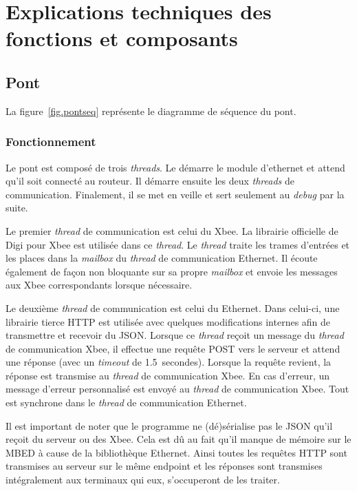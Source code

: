 \section{Explications techniques des fonctions et composants}
	\subsection{Pont}
	La figure~\ref{fig.pontseq} représente le diagramme de séquence du pont.
		\subsubsection{Fonctionnement}
		Le pont est composé de trois \emph{threads}. Le  démarre le module d’ethernet et attend qu’il soit connecté au routeur. Il démarre ensuite les deux \emph{threads} de communication. Finalement, il se met en veille et sert seulement au \emph{debug} par la suite. 

		Le premier \emph{thread} de communication est celui du Xbee. La librairie officielle de Digi pour Xbee est utilisée dans ce \emph{thread}. Le \emph{thread} traite les trames d’entrées et les places dans la \emph{mailbox} du \emph{thread} de communication Ethernet. Il écoute également de façon non bloquante sur sa propre \emph{mailbox} et envoie les messages aux Xbee correspondants lorsque nécessaire.

		Le deuxième \emph{thread} de communication est celui du Ethernet. Dans celui-ci, une librairie tierce HTTP est utilisée avec quelques modifications internes afin de transmettre et recevoir du JSON. Lorsque ce \emph{thread} reçoit un message du \emph{thread} de communication Xbee, il effectue une requête POST vers le serveur et attend une réponse (avec un \emph{timeout} de 1.5~secondes). Lorsque la requête revient, la réponse est transmise au \emph{thread} de communication Xbee. En cas d’erreur, un message d’erreur personnalisé est envoyé au \emph{thread} de communication Xbee. Tout est synchrone dans le \emph{thread} de communication Ethernet.

		Il est important de noter que le programme ne (dé)sérialise pas le JSON qu’il reçoit du serveur ou des Xbee. Cela est dû au fait qu’il manque de mémoire sur le MBED à cause de la bibliothèque Ethernet. Ainsi toutes les requêtes HTTP sont transmises au serveur sur le même \og endpoint \fg{} et les réponses sont transmises intégralement aux terminaux qui eux, s’occuperont de les traiter.
		
